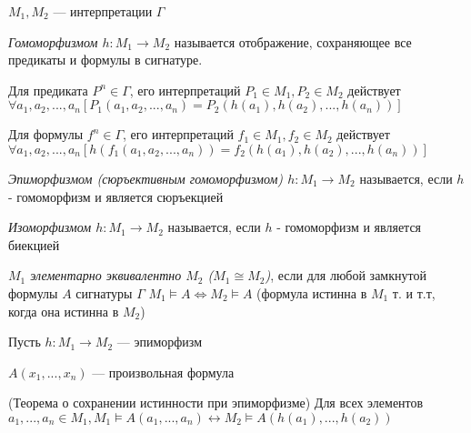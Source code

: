 \documentclass{article}
\begin{document}
$M_1, M_2$ --- интерпретации $\Gamma$
\begin{definition}
	\textit{Гомоморфизмом $h: M_1 \rightarrow M_2$} называется отображение, сохраняющее все предикаты и формулы в сигнатуре.

	Для предиката $P^n \in \Gamma$, его интерпретаций $P_1 \in M_1, P_2 \in M_2$ действует \\
	$\forall a_1, a_2,..., a_n[P_1(a_1, a_2,..., a_n) = P_2(h(a_1), h(a_2),..., h(a_n))]$

	Для формулы $f^n \in \Gamma$, его интерпретаций $f_1 \in M_1, f_2 \in M_2$ действует \\
	$\forall a_1, a_2,..., a_n[h(f_1(a_1, a_2,..., a_n)) = f_2(h(a_1), h(a_2),..., h(a_n))]$
\end{definition}

\begin{definition}
	\textit{Эпиморфизмом (сюръективным гомоморфизмом) $h: M_1 \rightarrow M_2$} называется, если $h$ - гомоморфизм и является сюръекцией
\end{definition}

\begin{definition}
	\textit{Изоморфизмом $h: M_1 \rightarrow M_2$} называется, если $h$ - гомоморфизм и является биекцией
\end{definition}

\begin{definition}
	\textit{$M_1$ элементарно эквивалентно $M_2$ ($M_1 \cong M_2$)}, если для любой замкнутой формулы $A$ сигнатуры $\Gamma$ $M_1 \vDash A \Leftrightarrow M_2 \vDash A$ (формула истинна в $M_1$ т. и т.т, когда она истинна в $M_2$)
\end{definition}

Пусть $h: M_1 \rightarrow M_2$ --- эпиморфизм

$A(x_1,..., x_n)$ --- произвольная формула
\begin{theorem}{(Теорема о сохранении истинности при эпиморфизме)}
	Для всех элементов $a_1,..., a_n \in M_1, M_1 \vDash A(a_1,..., a_n) \leftrightarrow M_2 \vDash A(h(a_1),..., h(a_2))$
\end{theorem}
\end{document}
